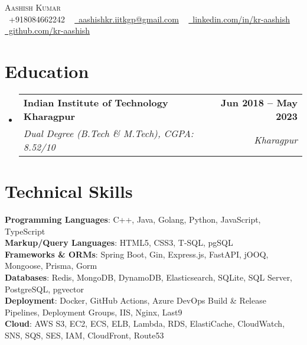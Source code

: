 \documentclass[letterpaper,11pt]{article}
\makeatletter
\newcommand{\resumeSubheading}[4]{
  \vspace{-2pt}\item
    \begin{tabular*}{1.0\textwidth}[t]{l@{\extracolsep{\fill}}r}
      \textbf{#1} & \textbf{\small #2} \\
      \textit{\small#3} & \textit{\small #4} \\
    \end{tabular*}\vspace{-7pt}
}
\newcommand{\resumeSubHeadingListStart}{\begin{itemize}[leftmargin=0.0in, label={}]}
\newcommand{\resumeSubHeadingListEnd}{\end{itemize}}
\makeatother
\begin{document}
\begin{center}
    {\Huge \scshape Aashish Kumar} \\ \vspace{2pt}
    \small \raisebox{-0.1\height}\faPhone\ +918084662242 ~ \href{mailto:aashishkr.iitkgp@gmail.com}{\raisebox{-0.2\height}\faEnvelope\  aashishkr.iitkgp@gmail.com} ~ 
    \href{https://www.linkedin.com/in/kr-aashish/}{\raisebox{-0.2\height}\faLinkedin\ linkedin.com/in/kr-aashish}  ~
    \href{https://github.com/kr-aashish}{\raisebox{-0.2\height}\faGithub\ github.com/kr-aashish}
    \vspace{-8pt}
\end{center}


\section{Education}
  \resumeSubHeadingListStart
    \resumeSubheading
      {Indian Institute of Technology Kharagpur}{Jun 2018 -- May 2023}
      {Dual Degree (B.Tech \& M.Tech), CGPA: 8.52/10}{Kharagpur}
  \resumeSubHeadingListEnd


\section{Technical Skills}
\begin{flushleft}
\setlength{\leftskip}{0.2in}
\small
\textbf{Programming Languages}{: C++, Java, Golang, Python, JavaScript, TypeScript} \\
\vspace{1pt}
\textbf{Markup/Query Languages}{: HTML5, CSS3, T‐SQL, pgSQL} \\
\vspace{1pt}
\textbf{Frameworks \& ORMs}{: Spring Boot, Gin, Express.js, FastAPI, jOOQ, Mongoose, Prisma, Gorm} \\
\vspace{1pt}
\textbf{Databases}{: Redis, MongoDB, DynamoDB, Elasticsearch, SQLite, SQL Server, PostgreSQL, pgvector} \\
\vspace{1pt}
\textbf{Deployment}{: Docker, GitHub Actions, Azure DevOps Build \& Release Pipelines, Deployment Groups, IIS, Nginx, Last9} \\
\vspace{1pt}
\textbf{Cloud}{: AWS S3, EC2, ECS, ELB, Lambda, RDS, ElastiCache, CloudWatch, SNS, SQS, SES, IAM, CloudFront, Route53 }
\end{flushleft}
 \vspace{-16pt}
\end{document}
